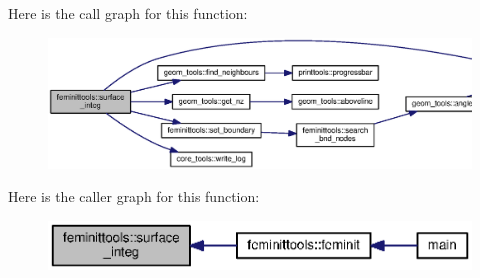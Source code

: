 Here is the call graph for this function\+:\nopagebreak
\begin{figure}[H]
\begin{center}
\leavevmode
\includegraphics[width=350pt]{namespacefeminittools_a36826eda9dbcdb639506e838d6ec2e3e_cgraph}
\end{center}
\end{figure}




Here is the caller graph for this function\+:\nopagebreak
\begin{figure}[H]
\begin{center}
\leavevmode
\includegraphics[width=350pt]{namespacefeminittools_a36826eda9dbcdb639506e838d6ec2e3e_icgraph}
\end{center}
\end{figure}


